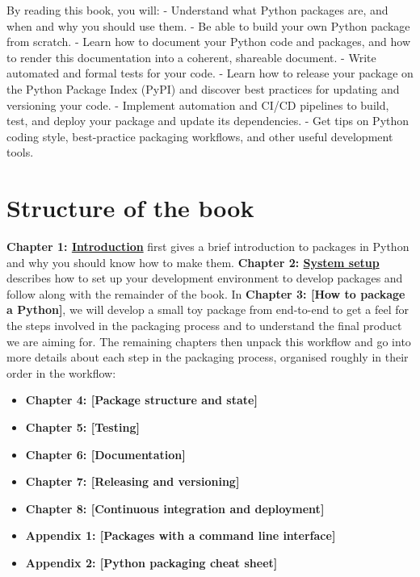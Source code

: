 \documentclass[
]{krantz}
\providecommand{\tightlist}{%
  \setlength{\itemsep}{0pt}\setlength{\parskip}{0pt}}
\begin{document}
By reading this book, you will:
- Understand what Python packages are, and when and why you should use them.
- Be able to build your own Python package from scratch.
- Learn how to document your Python code and packages, and how to render this documentation into a coherent, shareable document.
- Write automated and formal tests for your code.
- Learn how to release your package on the Python Package Index (PyPI) and discover best practices for updating and versioning your code.
- Implement automation and CI/CD pipelines to build, test, and deploy your package and update its dependencies.
- Get tips on Python coding style, best-practice packaging workflows, and other useful development tools.

\hypertarget{structure-of-the-book}{%
\section*{Structure of the book}\label{structure-of-the-book}}


\textbf{Chapter 1: \protect\hyperlink{introduction}{Introduction}} first gives a brief introduction to packages in Python and why you should know how to make them. \textbf{Chapter 2: \protect\hyperlink{system-setup}{System setup}} describes how to set up your development environment to develop packages and follow along with the remainder of the book. In \textbf{Chapter 3: {[}How to package a Python{]}}, we will develop a small toy package from end-to-end to get a feel for the steps involved in the packaging process and to understand the final product we are aiming for. The remaining chapters then unpack this workflow and go into more details about each step in the packaging process, organised roughly in their order in the workflow:

\begin{itemize}
\tightlist
\item
  \textbf{Chapter 4: {[}Package structure and state{]}}
\item
  \textbf{Chapter 5: {[}Testing{]}}
\item
  \textbf{Chapter 6: {[}Documentation{]}}
\item
  \textbf{Chapter 7: {[}Releasing and versioning{]}}
\item
  \textbf{Chapter 8: {[}Continuous integration and deployment{]}}
\item
  \textbf{Appendix 1: {[}Packages with a command line interface{]}}
\item
  \textbf{Appendix 2: {[}Python packaging cheat sheet{]}}
\end{itemize}
\end{document}
